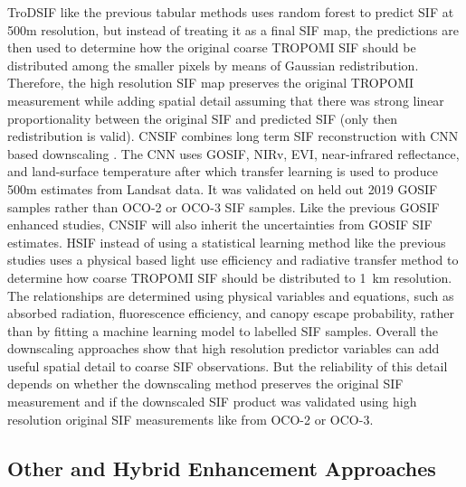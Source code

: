 TroDSIF \cite{chen2025improved} like the previous tabular methods uses random forest to predict SIF at 500m resolution, but instead of treating it as a final SIF map, the predictions are then used to determine how the original coarse TROPOMI SIF should be distributed among the smaller pixels by means of Gaussian redistribution. Therefore, the high resolution SIF map preserves the original TROPOMI measurement while adding spatial detail assuming that there was strong linear proportionality between the original SIF and predicted SIF (only then redistribution is valid). CNSIF combines long term SIF reconstruction with CNN based downscaling \cite{du2025cnsif}. The CNN uses GOSIF, NIRv, EVI, near-infrared reflectance, and land-surface temperature after which transfer learning is used to produce 500m estimates from Landsat data. It was validated on held out 2019 GOSIF samples rather than OCO-2 or OCO-3 SIF samples. Like the previous GOSIF enhanced studies, CNSIF will also inherit the uncertainties from GOSIF SIF estimates. HSIF \cite{zhang2023generating} instead of using a statistical learning method like the previous studies uses a physical based light use efficiency and radiative transfer method to determine how coarse TROPOMI SIF should be distributed to 1~km resolution. The relationships are determined using physical variables and equations, such as absorbed radiation, fluorescence efficiency, and canopy escape probability, rather than by fitting a machine learning model to labelled SIF samples. Overall the downscaling approaches show that high resolution predictor variables can add useful spatial detail to coarse SIF observations. But the reliability of this detail depends on whether the downscaling method preserves the original SIF measurement and if the downscaled SIF product was validated using high resolution original SIF measurements like from OCO-2 or OCO-3. 

\subsection{Other and Hybrid Enhancement Approaches}

